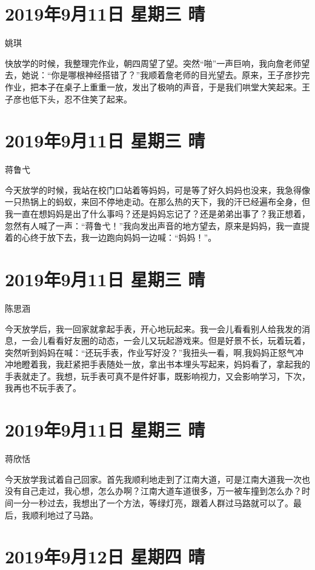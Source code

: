 \section{2019年9月11日 星期三 晴}

姚琪

快放学的时候，我整理完作业，朝四周望了望。突然“啪”一声巨响，我向詹老师望去，她说：“你是哪根神经搭错了？”我顺着詹老师的目光望去。原来，王子彦抄完作业，把本子在桌子上重重一放，发出了极响的声音，于是我们哄堂大笑起来。王子彦也低下头，忍不住笑了起来。

\section{2019年9月11日 星期三 晴}

蒋鲁弋

今天放学的时候，我站在校门口站着等妈妈，可是等了好久妈妈也没来，我急得像一只热锅上的蚂蚁，来回不停地走动。在那么热的天下，我的汗已经遍布全身，但我一直在想妈妈是出了什么事吗？还是妈妈忘记了？还是弟弟出事了？我正想着，忽然有人喊了一声：“蒋鲁弋！”我向发出声音的地方望去，原来是妈妈，我一直提着的心终于放下去，我一边跑向妈妈一边喊：“妈妈！”。

\section{2019年9月11日 星期三 晴}

陈思涵

今天放学后，我一回家就拿起手表，开心地玩起来。我一会儿看看别人给我发的消息，一会儿看看好友圈的动态，一会儿又玩起游戏来。但是好景不长，玩着玩着，突然听到妈妈在喊：“还玩手表，作业写好没？”我扭头一看，啊,我妈妈正怒气冲冲地瞪着我，我赶紧把手表随处一放，拿出书本埋头写起来，妈妈看了，拿起我的手表就走了。我想，玩手表可真不是件好事，既影响视力，又会影响学习，下次，我再也不玩手表了。

\section{2019年9月11日 星期三 晴}

蒋欣恬

今天放学我试着自己回家。首先我顺利地走到了江南大道，可是江南大道我一次也没有自己走过，我心想，怎么办啊？江南大道车道很多，万一被车撞到怎么办？时间一分一秒过去，我想出了一个方法，等绿灯亮，跟着人群过马路就可以了。最后，我顺利地过了马路。

\section{2019年9月12日 星期四 晴}

